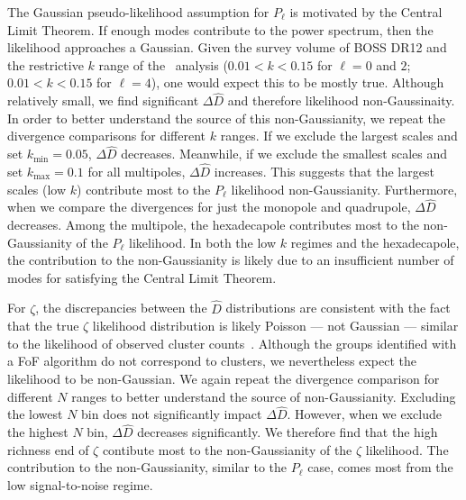 \documentclass[12pt, letterpaper, preprint]{aastex}
\newcommand{\Beut}{\citetalias{beutler2017}}
\begin{document}
The Gaussian pseudo-likelihood assumption for $P_\ell$ is motivated 
by the Central Limit Theorem. If enough modes contribute to the 
power spectrum, then the likelihood approaches a Gaussian. Given the 
survey volume of BOSS DR12 and the restrictive $k$ range of the \Beut~analysis 
($0.01 < k < 0.15$ for $\ell = 0$ and $2$; $0.01 < k < 0.15$ for $\ell = 4$), 
one would expect this to be mostly true. Although relatively small, we
find significant $\Delta \hat{D}$ and therefore likelihood non-Gaussinaity. 
In order to better understand the source of this non-Gaussianity, 
we repeat the divergence comparisons for different $k$ ranges. If we 
exclude the largest scales and set $k_\mathrm{min} = 0.05$, $\Delta \hat{D}$ 
decreases. Meanwhile, if we exclude the smallest scales and set 
$k_\mathrm{max} = 0.1$ for all 
multipoles, $\Delta \hat{D}$ increases. This suggests that the largest 
scales (low $k$) contribute most to the $P_\ell$ likelihood non-Gaussianity.
Furthermore, when we compare the divergences for just the monopole and quadrupole, 
$\Delta \hat{D}$ decreases. Among the multipole, the hexadecapole 
contributes most to the non-Gaussianity of the $P_\ell$ likelihood. 
In both the low $k$ regimes and the hexadecapole, the contribution to 
the non-Gaussianity is likely due to an insufficient number of modes 
for satisfying the Central Limit Theorem.

For $\zeta$, the discrepancies between the $\hat{D}$ distributions 
are consistent with the fact that the true $\zeta$ likelihood 
distribution is likely Poisson --- not Gaussian --- similar to the likelihood 
of observed cluster counts~\citep{cash1979,planckcollaboration2014,ade2016}. 
Although the groups identified with a FoF algorithm do not correspond
to clusters, we nevertheless expect the likelihood to be non-Gaussian. 
We again repeat the divergence comparison for different $N$ ranges 
to better understand the source of non-Gaussianity. Excluding the 
lowest $N$ bin does not significantly impact $\Delta \hat{D}$. However, 
when we exclude the highest $N$ bin, $\Delta \hat{D}$ decreases significantly. 
We therefore find that the high richness end of $\zeta$ contibute most to 
the non-Gaussianity of the $\zeta$ likelihood. The contribution to the 
non-Gaussianity, similar to the $P_\ell$ case, comes most from the low 
signal-to-noise regime. 
\end{document}
